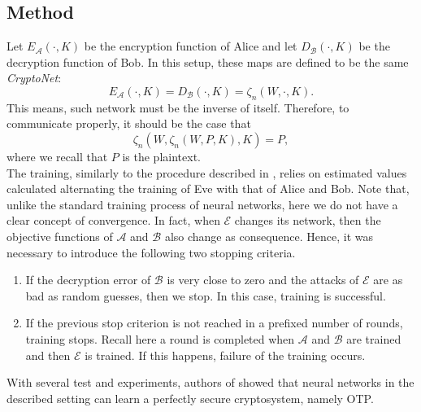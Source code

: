 \documentclass[%
    corpo=11pt,
    twoside,
    stile=classica,
    oldstyle,
    autoretitolo,
    tipotesi=magistrale,
    greek,
    evenboxes,
    english
]{toptesi}
\begin{document}
\subsection{Method}
Let $E_{\mathcal{A}}(\cdot, K)$ be the encryption function of Alice and let $D_{\mathcal{B}}(\cdot, K)$ be the decryption function of Bob. In this setup, these maps are defined to be the same \textit{CryptoNet}:
\begin{equation}
E_{\mathcal{A}}(\cdot, K) = D_{\mathcal{B}}(\cdot, K) = \zeta_n(W, \cdot, K).
\end{equation}
This means, such network must be the inverse of itself. Therefore, to communicate properly, it should be the case that 
\begin{equation}
\zeta_n \left(W,\zeta_n(W,P,K),K \right) = P,
\end{equation}
where we recall that $P$ is the plaintext. \\
The training, similarly to the procedure described in \cite{google}, relies on estimated values calculated alternating the training of Eve with that of Alice and Bob. Note that, unlike the standard training process of neural networks, here we do not have a clear concept of convergence. In fact, when $\mathcal{E}$ changes its network, then the objective functions of $\mathcal{A}$ and $\mathcal{B}$ also change as consequence. Hence, it was necessary to introduce the following two stopping criteria.
\begin{enumerate}
\item If the decryption error of $\mathcal{B}$ is very close to zero and the attacks of $\mathcal{E}$ are as bad as random guesses, then we stop. In this case, training is successful.
\item If the previous stop criterion is not reached in a prefixed number of rounds, training stops. Recall here a round is completed when $\mathcal{A}$ and $\mathcal{B}$ are trained and then $\mathcal{E}$ is trained. If this happens, failure of the training occurs.
\end{enumerate}
With several test and experiments, authors of \cite{brazilians} showed that neural networks in the described setting can learn a perfectly secure cryptosystem, namely OTP.
\end{document}
